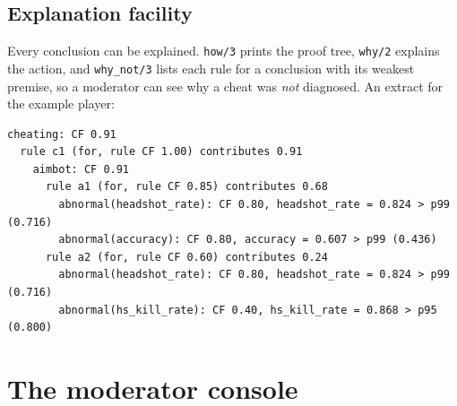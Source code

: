 \documentclass[11pt,a4paper]{article}
\newcommand{\code}[1]{\texttt{#1}}
\begin{document}
\subsection{Explanation facility}
Every conclusion can be explained. \code{how/3} prints the proof tree, \code{why/2} explains the
action, and \code{why\_not/3} lists each rule for a conclusion with its weakest premise, so a
moderator can see why a cheat was \emph{not} diagnosed. An extract for the example player:

{\small
\begin{verbatim}
cheating: CF 0.91
  rule c1 (for, rule CF 1.00) contributes 0.91
    aimbot: CF 0.91
      rule a1 (for, rule CF 0.85) contributes 0.68
        abnormal(headshot_rate): CF 0.80, headshot_rate = 0.824 > p99 (0.716)
        abnormal(accuracy): CF 0.80, accuracy = 0.607 > p99 (0.436)
      rule a2 (for, rule CF 0.60) contributes 0.24
        abnormal(headshot_rate): CF 0.80, headshot_rate = 0.824 > p99 (0.716)
        abnormal(hs_kill_rate): CF 0.40, hs_kill_rate = 0.868 > p95 (0.800)
\end{verbatim}
}

\section{The moderator console}
\label{sec:console}
\end{document}
